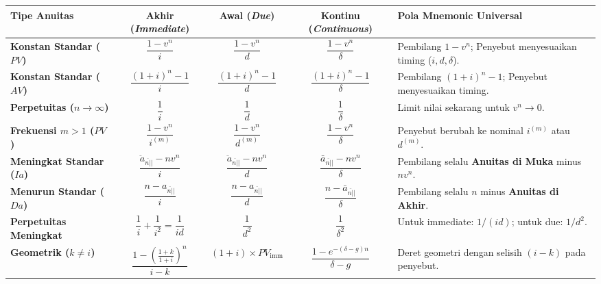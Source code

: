 \documentclass[10pt,a4paper]{article}
\newcommand{\angl}[1]{\overline{#1|}}
\begin{document}
\begin{tcolorbox}[
    enhanced,
    colback=white,
    colframe=primaryblue,
    boxrule=0.8pt,
    arc=2mm,
    top=1.5mm, bottom=1.5mm, left=1.5mm, right=1.5mm
]
\footnotesize
\centering
\setlength{\tabcolsep}{3.5pt}
\begin{tabular}{l c c c p{4.6cm}}
\toprule
\textbf{Tipe Anuitas} & \textbf{Akhir (\textit{Immediate})} & \textbf{Awal (\textit{Due})} & \textbf{Kontinu (\textit{Continuous})} & \textbf{Pola Mnemonic Universal} \\
\midrule
\textbf{Konstan Standar ($PV$)} & $\dfrac{1 - v^n}{i}$ & $\dfrac{1 - v^n}{d}$ & $\dfrac{1 - v^n}{\delta}$ & Pembilang $1 - v^n$; Penyebut menyesuaikan timing ($i, d, \delta$). \\
\addlinespace
\textbf{Konstan Standar ($AV$)} & $\dfrac{(1+i)^n - 1}{i}$ & $\dfrac{(1+i)^n - 1}{d}$ & $\dfrac{(1+i)^n - 1}{\delta}$ & Pembilang $(1+i)^n - 1$; Penyebut menyesuaikan timing. \\
\addlinespace
\textbf{Perpetuitas ($n \to \infty$)} & $\dfrac{1}{i}$ & $\dfrac{1}{d}$ & $\dfrac{1}{\delta}$ & Limit nilai sekarang untuk $v^n \to 0$. \\
\addlinespace
\textbf{Frekuensi $m > 1$ ($PV$)} & $\dfrac{1 - v^n}{i^{(m)}}$ & $\dfrac{1 - v^n}{d^{(m)}}$ & $\dfrac{1 - v^n}{\delta}$ & Penyebut berubah ke nominal $i^{(m)}$ atau $d^{(m)}$. \\
\addlinespace
\textbf{Meningkat Standar ($Ia$)} & $\dfrac{\ddot{a}_{\angl{n}|} - n v^n}{i}$ & $\dfrac{\ddot{a}_{\angl{n}|} - n v^n}{d}$ & $\dfrac{\bar{a}_{\angl{n}|} - n v^n}{\delta}$ & Pembilang selalu \textbf{Anuitas di Muka} minus $n v^n$. \\
\addlinespace
\textbf{Menurun Standar ($Da$)} & $\dfrac{n - a_{\angl{n}|}}{i}$ & $\dfrac{n - a_{\angl{n}|}}{d}$ & $\dfrac{n - \bar{a}_{\angl{n}|}}{\delta}$ & Pembilang selalu $n$ minus \textbf{Anuitas di Akhir}. \\
\addlinespace
\textbf{Perpetuitas Meningkat} & $\dfrac{1}{i} + \dfrac{1}{i^2} = \dfrac{1}{id}$ & $\dfrac{1}{d^2}$ & $\dfrac{1}{\delta^2}$ & Untuk immediate: $1/(id)$; untuk due: $1/d^2$. \\
\addlinespace
\textbf{Geometrik ($k \ne i$)} & $\dfrac{1 - \left(\frac{1+k}{1+i}\right)^n}{i - k}$ & $(1+i) \times PV_{\text{imm}}$ & $\dfrac{1 - e^{-(\delta - g)n}}{\delta - g}$ & Deret geometri dengan selisih $(i - k)$ pada penyebut. \\
\bottomrule
\end{tabular}
\end{tcolorbox}
\end{document}
